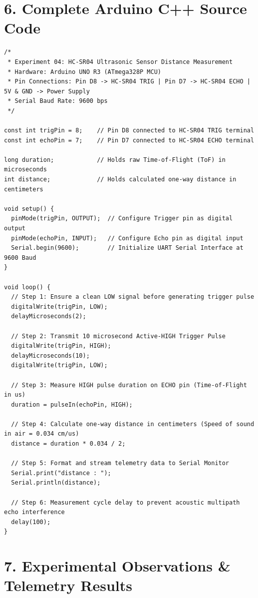 \documentclass[10pt,a4paper]{article}
\begin{document}
\section*{6. Complete Arduino C++ Source Code}
\begin{lstlisting}[style=bwArduino, caption={\textbf{Program Listing 4.1: Arduino C++ Firmware for HC-SR04 Ultrasonic Distance Measurement.}}]
/*
 * Experiment 04: HC-SR04 Ultrasonic Sensor Distance Measurement
 * Hardware: Arduino UNO R3 (ATmega328P MCU)
 * Pin Connections: Pin D8 -> HC-SR04 TRIG | Pin D7 -> HC-SR04 ECHO | 5V & GND -> Power Supply
 * Serial Baud Rate: 9600 bps
 */

const int trigPin = 8;    // Pin D8 connected to HC-SR04 TRIG terminal
const int echoPin = 7;    // Pin D7 connected to HC-SR04 ECHO terminal

long duration;            // Holds raw Time-of-Flight (ToF) in microseconds
int distance;             // Holds calculated one-way distance in centimeters

void setup() {
  pinMode(trigPin, OUTPUT);  // Configure Trigger pin as digital output
  pinMode(echoPin, INPUT);   // Configure Echo pin as digital input
  Serial.begin(9600);        // Initialize UART Serial Interface at 9600 Baud
}

void loop() {
  // Step 1: Ensure a clean LOW signal before generating trigger pulse
  digitalWrite(trigPin, LOW);
  delayMicroseconds(2);
  
  // Step 2: Transmit 10 microsecond Active-HIGH Trigger Pulse
  digitalWrite(trigPin, HIGH);
  delayMicroseconds(10);
  digitalWrite(trigPin, LOW);
  
  // Step 3: Measure HIGH pulse duration on ECHO pin (Time-of-Flight in us)
  duration = pulseIn(echoPin, HIGH);
  
  // Step 4: Calculate one-way distance in centimeters (Speed of sound in air = 0.034 cm/us)
  distance = duration * 0.034 / 2;
  
  // Step 5: Format and stream telemetry data to Serial Monitor
  Serial.print("distance : ");
  Serial.println(distance);
  
  // Step 6: Measurement cycle delay to prevent acoustic multipath echo interference
  delay(100);
}
\end{lstlisting}

\section*{7. Experimental Observations \& Telemetry Results}
\end{document}
